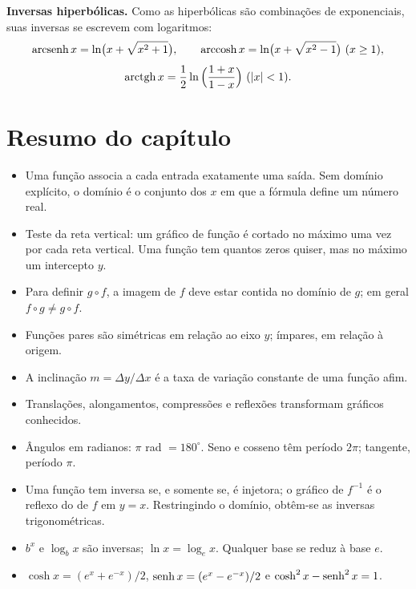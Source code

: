 \textbf{Inversas hiperbólicas.} Como as hiperbólicas são combinações de exponenciais, suas
inversas se escrevem com logaritmos:
\[
\operatorname{arcsenh} x=\ln\!\big(x+\sqrt{x^2+1}\big),\qquad
\operatorname{arccosh} x=\ln\!\big(x+\sqrt{x^2-1}\big)\ (x\ge1),\]\[
\arctgh x=\frac12\ln\Big(\frac{1+x}{1-x}\Big)\ (|x|<1).
\]

\section*{Resumo do capítulo}
\begin{itemize}
\item Uma função associa a cada entrada exatamente uma saída. Sem domínio explícito, o
  domínio é o conjunto dos $x$ em que a fórmula define um número real.
\item Teste da reta vertical: um gráfico de função é cortado no máximo uma vez por cada
  reta vertical. Uma função tem quantos zeros quiser, mas no máximo um intercepto $y$.
\item Para definir $g\circ f$, a imagem de $f$ deve estar contida no domínio de $g$; em
  geral $f\circ g\neq g\circ f$.
\item Funções pares são simétricas em relação ao eixo $y$; ímpares, em relação à origem.
\item A inclinação $m=\Delta y/\Delta x$ é a taxa de variação constante de uma função afim.
\item Translações, alongamentos, compressões e reflexões transformam gráficos conhecidos.
\item Ângulos em radianos: $\pi$ rad $=180^\circ$. Seno e cosseno têm período $2\pi$;
  tangente, período $\pi$.
\item Uma função tem inversa se, e somente se, é injetora; o gráfico de $f^{-1}$ é o reflexo
  do de $f$ em $y=x$. Restringindo o domínio, obtêm-se as inversas trigonométricas.
\item $b^x$ e $\log_b x$ são inversas; $\ln x=\log_e x$. Qualquer base se reduz à base $e$.
\item $\cosh x=(e^x+e^{-x})/2$, $\operatorname{senh} x=(e^x-e^{-x})/2$ e $\cosh^2x-\operatorname{senh}^2x=1$.
\end{itemize}


